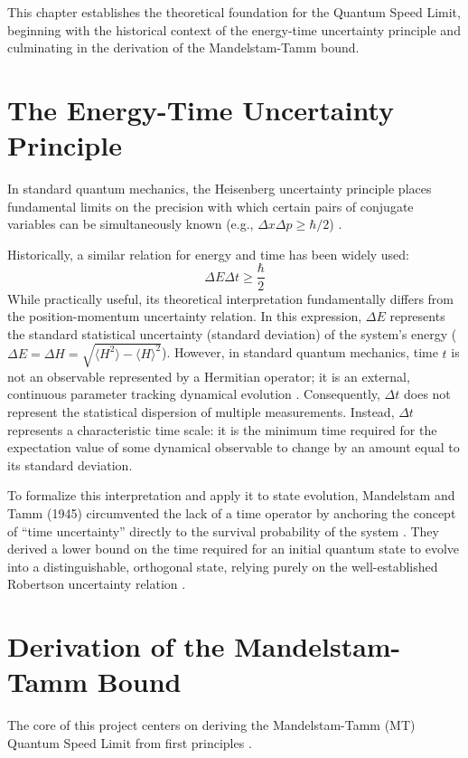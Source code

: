 This chapter establishes the theoretical foundation for the Quantum Speed Limit, beginning with the historical context of the energy-time uncertainty principle and culminating in the derivation of the Mandelstam-Tamm bound.

\section{The Energy-Time Uncertainty Principle}
In standard quantum mechanics, the Heisenberg uncertainty principle places fundamental limits on the precision with which certain pairs of conjugate variables can be simultaneously known (e.g., $\Delta x \Delta p \ge \hbar/2$) \cite{griffiths2004}. 

Historically, a similar relation for energy and time has been widely used:
\begin{equation}
    \Delta E \Delta t \ge \frac{\hbar}{2}
\end{equation}
While practically useful, its theoretical interpretation fundamentally differs from the position-momentum uncertainty relation. In this expression, $\Delta E$ represents the standard statistical uncertainty (standard deviation) of the system's energy ($\Delta E = \Delta H = \sqrt{\langle H^2 \rangle - \langle H \rangle^2}$). However, in standard quantum mechanics, time $t$ is not an observable represented by a Hermitian operator; it is an external, continuous parameter tracking dynamical evolution \cite{griffiths2004}. Consequently, $\Delta t$ does not represent the statistical dispersion of multiple measurements. Instead, $\Delta t$ represents a characteristic time scale: it is the minimum time required for the expectation value of some dynamical observable to change by an amount equal to its standard deviation.

To formalize this interpretation and apply it to state evolution, Mandelstam and Tamm (1945) circumvented the lack of a time operator by anchoring the concept of ``time uncertainty'' directly to the survival probability of the system \cite{mandelstam1945}. They derived a lower bound on the time required for an initial quantum state to evolve into a distinguishable, orthogonal state, relying purely on the well-established Robertson uncertainty relation \cite{deffner2017}.


\section{Derivation of the Mandelstam-Tamm Bound}
The core of this project centers on deriving the Mandelstam-Tamm (MT) Quantum Speed Limit from first principles \cite{deffner2017}. 

